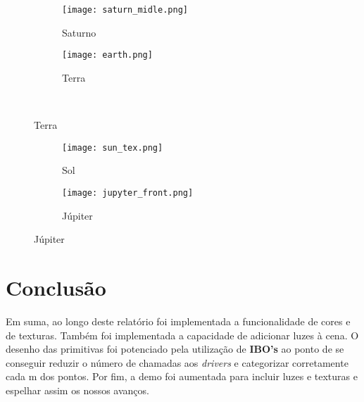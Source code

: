 \documentclass[14pt, a4 paper]{report}
\begin{document}
\begin{figure}[h]
    \centering
    \begin{subfigure}{.5\textwidth}
    \centering
    \texttt{[image: saturn\_midle.png]}
    \caption{Saturno}
    \label{fig:sub5}
    \end{subfigure}%
    \begin{subfigure}{.5\textwidth}
    \centering
    \texttt{[image: earth.png]}
    \caption{Terra}
    \label{fig:sub6}
    \end{subfigure}%
    \\
\end{figure}
\begin{figure}[h]
    \begin{subfigure}{.5\textwidth}
    \centering
    \texttt{[image: sun\_tex.png]}
    \caption{Sol}
    \label{fig:sub5}
    \end{subfigure}%
    \begin{subfigure}{.5\textwidth}
    \centering
    \texttt{[image: jupyter\_front.png]}
    \caption{Júpiter}
    \label{fig:sub6}
    \end{subfigure}%
    \label{fig:2}
\end{figure}

\chapter{Conclusão} \label{chap:conclusion}
Em suma, ao longo deste relatório foi implementada a funcionalidade de cores e de texturas. Também foi implementada a capacidade de adicionar luzes à cena. O desenho das primitivas foi potenciado pela utilização de \textbf{IBO's} ao ponto de se conseguir reduzir o número de chamadas aos \textit{drivers} e categorizar corretamente cada m dos pontos. Por fim, a demo foi aumentada para incluir luzes e texturas e espelhar assim os nossos avanços.
\end{document}
